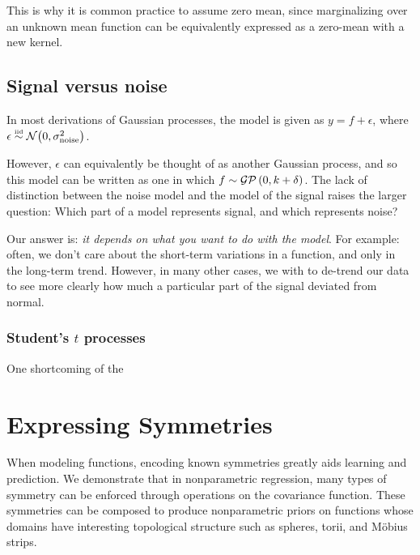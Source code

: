 This is why it is common practice to assume zero mean, since marginalizing over an unknown mean function can be equivalently expressed as a zero-mean \gp{} with a new kernel.




\subsection{Signal versus noise}

In most derivations of Gaussian processes, the model is given as $y = f + \epsilon$, where $\epsilon \overset{\mbox{\tiny iid}}{\sim} \mathcal{N}\!\left(0,\sigma^2_{\textnormal{noise}}\right)$.

However, $\epsilon$ can equivalently be thought of as another Gaussian process, and so this model can be written as one in which $f \sim \mathcal{GP}\left(0, k + \delta \right)$.  The lack of distinction between the noise model and the model of the signal raises the larger question:  Which part of a model represents signal, and which represents noise?

Our answer is: \emph{it depends on what you want to do with the model}.  For example: often, we don't care about the short-term variations in a function, and only in the long-term trend.  However, in many other cases, we with to de-trend our data to see more clearly how much a particular part of the signal deviated from normal.

\subsubsection{Student's $t$ processes}

One shortcoming of the




\section{Expressing Symmetries}


When modeling functions, encoding known symmetries greatly aids learning and prediction.  We demonstrate that in nonparametric regression, many types of symmetry can be enforced through operations on the covariance function.  These symmetries can be composed to produce nonparametric priors on functions whose domains have interesting topological structure such as spheres, torii, and M\"{o}bius strips.




